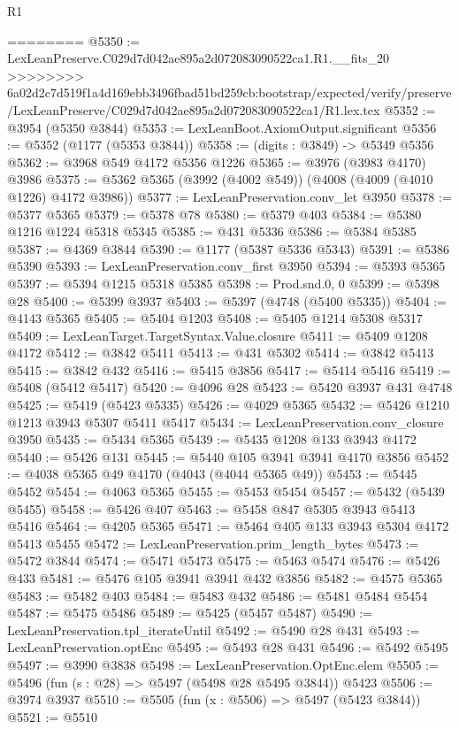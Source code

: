 \begin{lexlean}{R1}
\begin{coremodule}
{{{{{{{{{{{{{{{{{{{{{{{{{{{{{{{{{{{{{{{{{{{{{{{{{{{{{{{{{{{{{{{{{{{{{{{{{{{{{{{{{{{{{{{{{{{{{{{{{{{{{{{{{{{{{{{{{{{{{{{{{{{{{{{{{{{{{{{{{{{{{{{{{{{{{{{{{{{{{{{{{{{{{{{{{{{{{{{{{{{{{{{{{{========
@5350 := LexLeanPreserve.C029d7d042ae895a2d072083090522ca1.R1.__fits_20
>>>>>>>> 6a02d2c7d519f1a4d169ebb3496fbad51bd259cb:bootstrap/expected/verify/preserve/LexLeanPreserve/C029d7d042ae895a2d072083090522ca1/R1.lex.tex
@5352 := @3954 (@5350 @3844)
@5353 := LexLeanBoot.AxiomOutput.significant
@5356 := @5352 (@1177 (@5353 @3844))
@5358 := (digits : @3849) -> @5349 @5356
@5362 := @3968 @549 @4172 @5356 @1226
@5365 := @3976 (@3983 @4170) @3986
@5375 := @5362 @5365 (@3992 (@4002 @549)) (@4008 (@4009 (@4010 @1226) @4172 @3986))
@5377 := LexLeanPreservation.conv_let @3950
@5378 := @5377 @5365
@5379 := @5378 @78
@5380 := @5379 @403
@5384 := @5380 @1216 @1224 @5318 @5345
@5385 := @431 @5336
@5386 := @5384 @5385
@5387 := @4369 @3844
@5390 := @1177 (@5387 @5336 @5343)
@5391 := @5386 @5390
@5393 := LexLeanPreservation.conv_first @3950
@5394 := @5393 @5365
@5397 := @5394 @1215 @5318 @5385
@5398 := Prod.snd.{0, 0}
@5399 := @5398 @28
@5400 := @5399 @3937
@5403 := @5397 (@4748 (@5400 @5335))
@5404 := @4143 @5365
@5405 := @5404 @1203
@5408 := @5405 @1214 @5308 @5317
@5409 := LexLeanTarget.TargetSyntax.Value.closure
@5411 := @5409 @1208 @4172
@5412 := @3842 @5411
@5413 := @431 @5302
@5414 := @3842 @5413
@5415 := @3842 @432
@5416 := @5415 @3856
@5417 := @5414 @5416
@5419 := @5408 (@5412 @5417)
@5420 := @4096 @28
@5423 := @5420 @3937 @431 @4748
@5425 := @5419 (@5423 @5335)
@5426 := @4029 @5365
@5432 := @5426 @1210 @1213 @3943 @5307 @5411 @5417
@5434 := LexLeanPreservation.conv_closure @3950
@5435 := @5434 @5365
@5439 := @5435 @1208 @133 @3943 @4172
@5440 := @5426 @131
@5445 := @5440 @105 @3941 @3941 @4170 @3856
@5452 := @4038 @5365 @49 @4170 (@4043 (@4044 @5365 @49))
@5453 := @5445 @5452
@5454 := @4063 @5365
@5455 := @5453 @5454
@5457 := @5432 (@5439 @5455)
@5458 := @5426 @407
@5463 := @5458 @847 @5305 @3943 @5413 @5416
@5464 := @4205 @5365
@5471 := @5464 @405 @133 @3943 @5304 @4172 @5413 @5455
@5472 := LexLeanPreservation.prim_length_bytes
@5473 := @5472 @3844
@5474 := @5471 @5473
@5475 := @5463 @5474
@5476 := @5426 @433
@5481 := @5476 @105 @3941 @3941 @432 @3856
@5482 := @4575 @5365
@5483 := @5482 @403
@5484 := @5483 @432
@5486 := @5481 @5484 @5454
@5487 := @5475 @5486
@5489 := @5425 (@5457 @5487)
@5490 := LexLeanPreservation.tpl_iterateUntil
@5492 := @5490 @28 @431
@5493 := LexLeanPreservation.optEnc
@5495 := @5493 @28 @431
@5496 := @5492 @5495
@5497 := @3990 @3838
@5498 := LexLeanPreservation.OptEnc.elem
@5505 := @5496 (fun (s : @28) => @5497 (@5498 @28 @5495 @3844)) @5423
@5506 := @3974 @3937
@5510 := @5505 (fun (x : @5506) => @5497 (@5423 @3844))
@5521 := @5510
}}}}}}}}}}}}}}}}}}}}}}}}}}}}}}}}}}}}}}}}}}}}}}}}}}}}}}}}}}}}}}}}}}}}}}}}}}}}}}}}}}}}}}}}}}}}}}}}}}}}}}}}}}}}}}}}}}}}}}}}}}}}}}}}}}}}}}}}}}}}}}}}}}}}}}}}}}}}}}}}}}}}}}}}}}}}}}}}}}}}}}}}}}
\end{coremodule}
\end{lexlean}
